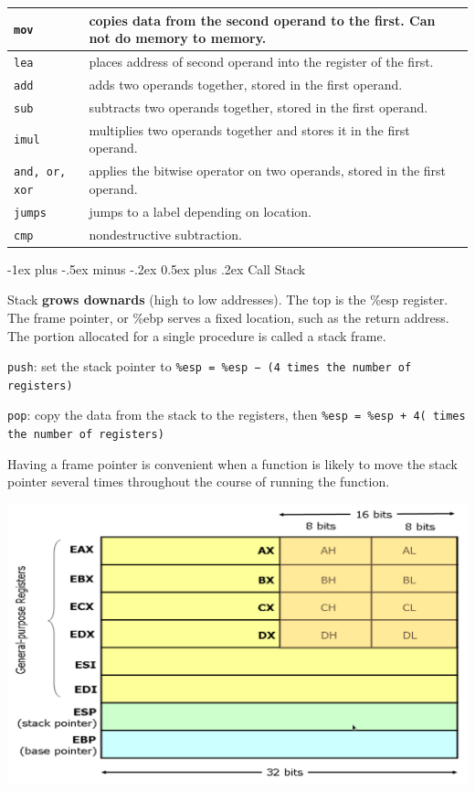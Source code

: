 \documentclass[10pt,landscape]{article}
\makeatletter
\renewcommand{\section}{\@startsection{section}{1}{0mm}%
                                {-1ex plus -.5ex minus -.2ex}%
                                {0.5ex plus .2ex}%
                                {\normalfont\large\bfseries}}
\makeatother
\begin{document}
\begin{multicols}{3}
\begin{center}
\begin{tabular}{|p{1.1cm}|p{6cm}|}
    \hline
\texttt{mov} & copies data from the second operand to the first. Can not do memory to memory.\\\hline
\texttt{lea} & places address of second operand into the register of the first.\\\hline
\texttt{add} & adds two operands together, stored in the first operand.\\\hline
\texttt{sub} & subtracts two operands together, stored in the first operand.\\\hline
\texttt{imul} & multiplies two operands together and stores it in the first operand.\\\hline
\texttt{and, or, xor} & applies the bitwise operator on two operands, stored in the first operand.\\\hline
\texttt{jumps} & jumps to a label depending on location.\\\hline
\texttt{cmp} & nondestructive subtraction.\\\hline
\end{tabular}
\end{center}

\section{Call Stack}

Stack {\bf grows downards} (high to low addresses). The top is the \%esp
register. The frame pointer, or \%ebp serves a fixed location, such as the
return address. The portion allocated for a single procedure is called a
stack frame.

\texttt{push}: set the stack pointer to
\texttt{\%esp = \%esp − (4 times the number of registers)}

\texttt{pop}: copy the data from the stack to the registers, then
\texttt{\%esp = \%esp + 4( times the number of registers)}

Having a frame pointer is convenient when a function is likely to move
the stack pointer several times throughout the course of running the
function.

\includegraphics[scale=.175]{reg}


\end{multicols}
\end{document}
